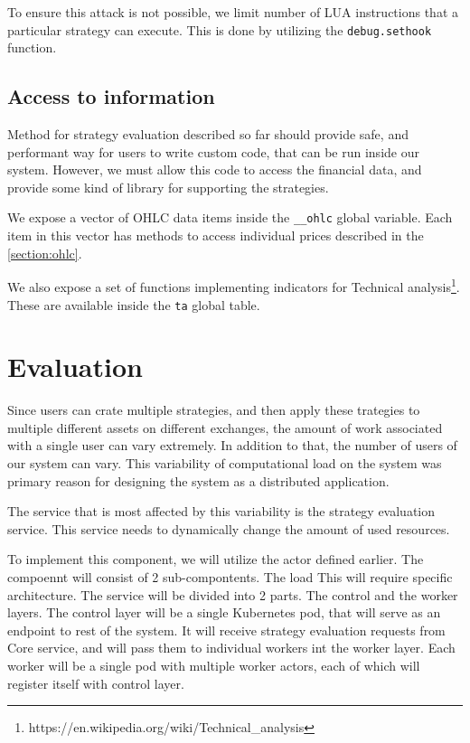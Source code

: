 To ensure this attack is not possible, we limit number of LUA instructions that a particular strategy can execute.
This is done by utilizing the \verb|debug.sethook| function.
\subsection{Access to information}
Method for strategy evaluation described so far should provide safe, and performant
way for users to write custom code, that can be run inside our system. However, we must allow this code to access the
financial data, and provide some kind of library for supporting the strategies.

We expose a vector of OHLC data items inside the \verb|__ohlc| global variable. Each item in this vector
has methods to access individual prices described in the \autoref{section:ohlc}.

We also expose a set of functions implementing indicators for Technical analysis\footnote{https://en.wikipedia.org/wiki/Technical\_analysis}.
These are available inside the \verb|ta| global table.


\section{Evaluation}
Since users can crate multiple strategies, and then apply these trategies to multiple different assets on different exchanges,
the amount of work associated with a single user can vary extremely. In addition to that, the number of users of our system can vary.
This variability of computational load on the system was primary reason for designing the system as a distributed application.

The service that is most affected by this variability is the strategy evaluation service. This service needs to
dynamically change the amount of used resources.


To implement this component, we will utilize the  actor defined earlier. The compoennt
will consist of 2 sub-compontents. The load
This will require specific architecture. The service will be divided into 2 parts. The control and the worker layers.
The control layer will be a single Kubernetes pod, that will serve as an endpoint to rest of the system. It will receive
strategy evaluation requests from Core service, and will pass them to individual workers int the worker layer.
Each worker will be a single pod with multiple worker actors, each of which will register itself with control layer.

